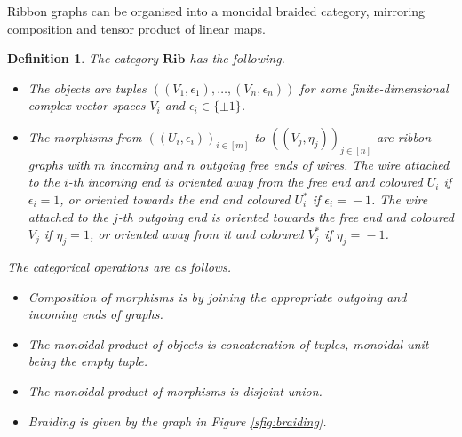 \documentclass{amsart}
\newtheorem{definition}[conjecture]{Definition}
\begin{document}
Ribbon graphs can be organised into a monoidal braided category, mirroring composition and tensor product of linear maps.
\begin{definition}\label{def:rib_category}
The category $\mathbf{Rib}$ has the following.
\begin{itemize}
\item The objects are tuples $((V_1,\epsilon_1),\dots,(V_n,\epsilon_n))$ for some finite-dimensional complex vector spaces $V_i$ and $\epsilon_i\in\{\pm1\}$.
\item The morphisms from $((U_i,\epsilon_i))_{i\in[m]}$ to $((V_j,\eta_j))_{j\in[n]}$ are ribbon graphs with $m$ incoming and $n$ outgoing free ends of wires. The wire attached to the $i$-th incoming end is oriented away from the free end and coloured $U_i$ if $\epsilon_i\!=\!1$, or oriented towards the end and coloured $U_i^*$ if $\epsilon_i\!=\!-1$. The wire attached to the $j$-th outgoing end is oriented towards the free end and coloured $V_j$ if $\eta_j\!=\!1$, or oriented away from it and coloured $V_j^*$ if $\eta_j\!=\!-1$.
\end{itemize}
The categorical operations are as follows.
\begin{itemize}
\item Composition of morphisms is by joining the appropriate outgoing and incoming ends of graphs.
\item The monoidal product of objects is concatenation of tuples, monoidal unit being the empty tuple.
\item The monoidal product of morphisms is disjoint union.
\item Braiding is given by the graph in Figure \ref{sfig:braiding}.
\end{itemize}
\end{definition}
\end{document}
